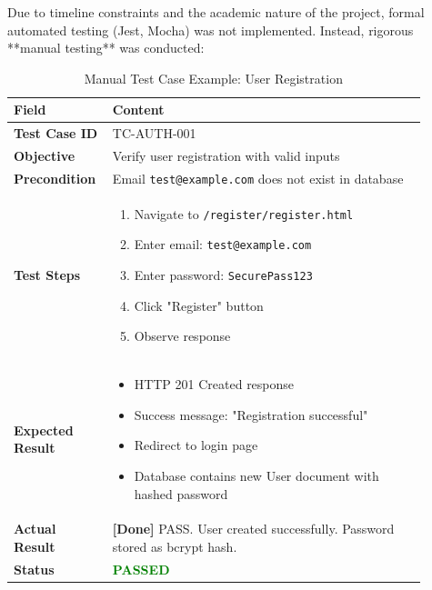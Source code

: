 \documentclass[12pt, a4paper]{report}
\begin{document}
Due to timeline constraints and the academic nature of the project, formal automated testing (Jest, Mocha) was not implemented. Instead, rigorous **manual testing** was conducted:

\begin{table}[H]
\centering
\caption{Manual Test Case Example: User Registration}
\label{tab:test_register}
\small
\begin{tabular}{@{}p{0.18\linewidth}p{0.72\linewidth}@{}}
\toprule
\textbf{Field} & \textbf{Content} \\
\midrule
\textbf{Test Case ID} & TC-AUTH-001 \\
\textbf{Objective} & Verify user registration with valid inputs \\
\textbf{Precondition} & Email \texttt{test@example.com} does not exist in database \\
\textbf{Test Steps} & 
\begin{minipage}[t]{\linewidth}
\begin{enumerate}[nosep,leftmargin=*]
    \item Navigate to \texttt{/register/register.html}
    \item Enter email: \texttt{test@example.com}
    \item Enter password: \texttt{SecurePass123}
    \item Click "Register" button
    \item Observe response
\end{enumerate}
\end{minipage} \\
\textbf{Expected Result} & 
\begin{minipage}[t]{\linewidth}
\begin{itemize}[nosep,leftmargin=*]
    \item HTTP 201 Created response
    \item Success message: "Registration successful"
    \item Redirect to login page
    \item Database contains new User document with hashed password
\end{itemize}
\end{minipage} \\
\textbf{Actual Result} & \textbf{[Done]} PASS. User created successfully. Password stored as bcrypt hash. \\
\textbf{Status} & \textcolor{green}{\textbf{PASSED}} \\
\bottomrule
\end{tabular}
\end{table}
\end{document}
